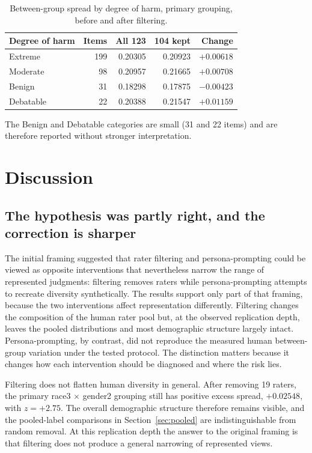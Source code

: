 \documentclass[11pt,a4paper]{article}
\begin{document}
\begin{table}[htbp]
\centering
\caption{Between-group spread by degree of harm, primary grouping, before and after filtering.}
\label{tab:harmbreak}
\small\begin{tabular}{lrrrr}
\toprule
\textbf{Degree of harm} & \textbf{Items} & \textbf{All 123} & \textbf{104 kept} & \textbf{Change} \\
\midrule
Extreme & 199 & 0.20305 & 0.20923 & $+0.00618$ \\
Moderate & 98 & 0.20957 & 0.21665 & $+0.00708$ \\
Benign & 31 & 0.18298 & 0.17875 & $-0.00423$ \\
Debatable & 22 & 0.20388 & 0.21547 & $+0.01159$ \\
\bottomrule
\end{tabular}
\end{table}

The Benign and Debatable categories are small (31 and 22 items) and are therefore reported
without stronger interpretation.

\section{Discussion}

\subsection{The hypothesis was partly right, and the correction is sharper}

The initial framing suggested that rater filtering and persona-prompting could be viewed as
opposite interventions that nevertheless narrow the range of represented judgments: filtering
removes raters while persona-prompting attempts to recreate diversity synthetically. The results
support only part of that framing, because the two interventions affect representation
differently. Filtering changes the composition of the human rater pool but, at the observed
replication depth, leaves the pooled distributions and most demographic structure largely
intact. Persona-prompting, by contrast, did not reproduce the measured human between-group
variation under the tested protocol. The distinction matters because it changes how each
intervention should be diagnosed and where the risk lies.

Filtering does not flatten human diversity in general. After removing 19 raters, the primary
race3 $\times$ gender2 grouping still has positive excess spread, $+0.02548$, with $z = +2.75$.
The overall demographic structure therefore remains visible, and the pooled-label comparisons in
Section~\ref{sec:pooled} are indistinguishable from random removal. At this replication depth the
answer to the original framing is that filtering does not produce a general narrowing of
represented views.
\end{document}
